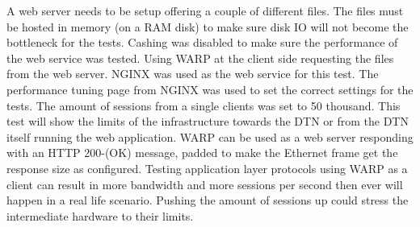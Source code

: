 A web server needs to be setup offering a couple of different files. The files must be hosted in memory (on a RAM disk) to make sure disk IO will not become the bottleneck for the tests. Cashing was disabled to make sure the performance of the web service was tested. Using WARP at the client side requesting the files from the web server. NGINX\cite{nginx} was used as the web service for this test. The performance tuning page from NGINX was used to set the correct settings for the tests\cite{nginxtuning}. The amount of sessions from a single clients was set to 50 thousand. This test will show the limits of the infrastructure towards the DTN or from the DTN itself running the web application. WARP can be used as a web server responding with an HTTP 200-(OK) message, padded to make the Ethernet frame get the response size as configured. Testing application layer protocols using WARP as a client can result in more bandwidth and more sessions per second then ever will happen in a real life scenario. Pushing the amount of sessions up could stress the intermediate hardware to their limits.

\
